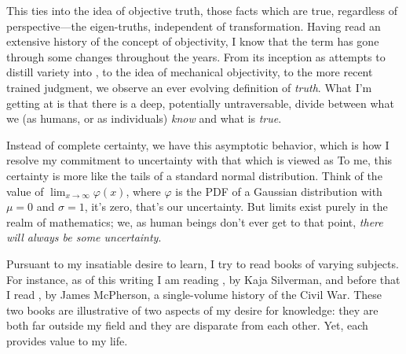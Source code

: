 \documentclass[../butidigress.tex]{subfiles}
\begin{document}
This ties into the idea of objective truth, those facts which are true, regardless of perspective---the eigen-truths, independent of transformation.
Having read an extensive history of the concept of objectivity, I know that the term has gone through some changes throughout the years\parencite{objectivity}.
From its inception as attempts to distill variety into , to the idea of mechanical objectivity, to the more recent trained judgment, we observe an ever evolving definition of \emph{truth}.
What I'm getting at is that there is a deep, potentially untraversable, divide between what we (as humans, or as individuals) \emph{know} and what is \emph{true}.

Instead of complete certainty, we have this asymptotic behavior, which is how I resolve my commitment to uncertainty with that which is viewed as 
To me, this certainty is more like the tails of a standard normal distribution.
Think of the value of $\lim_{x\to\infty}\varphi(x)$, where $\varphi$ is the PDF of a Gaussian distribution with $\mu = 0$ and $\sigma = 1$, it's zero, that's our uncertainty.
But limits exist purely in the realm of mathematics; we, as human beings don't ever get to that point, \emph{there will always be some uncertainty}.


Pursuant to my insatiable desire to learn, I try to read books of varying subjects.
For instance, as of this writing I am reading , by Kaja Silverman, and before that I read , by James McPherson, a single-volume history of the Civil War.
These two books are illustrative of two aspects of my desire for knowledge: they are both far outside my field and they are disparate from each other.
Yet, each provides value to my life.
\end{document}
